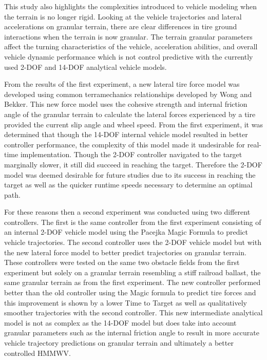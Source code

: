 \documentclass[12pt,onecolumn]{report}
\begin{document}
This study also highlights the complexities introduced to vehicle modeling when the terrain is no longer rigid. Looking at the vehicle trajectories and lateral accelerations on granular terrain, there are clear differences in tire ground interactions when the terrain is now granular. The terrain granular parameters affect the turning characteristics of the vehicle, acceleration abilities, and overall vehicle dynamic performance which is not control predictive with the currently used 2-DOF and 14-DOF analytical vehicle models. 

From the results of the first experiment, a new lateral tire force model was developed using common terramechanics relationships developed by Wong and Bekker. This new force model uses the cohesive strength and internal friction angle of the granular terrain to calculate the lateral forces experienced by a tire provided the current slip angle and wheel speed. From the first experiment, it was determined that though the 14-DOF internal vehicle model resulted in better controller performance, the complexity of this model made it undesirable for real-time implementation. Though the 2-DOF controller navigated to the target marginally slower, it still did succeed in reaching the target. Therefore the 2-DOF model was deemed desirable for future studies due to its success in reaching the target as well as the quicker runtime speeds necessary to determine an optimal path. 

For these reasons then a second experiment was conducted using two different controllers. The first is the same controller from the first experiment consisting of an internal 2-DOF vehicle model using the Pacejka Magic Formula to predict vehicle trajectories. The second controller uses the 2-DOF vehicle model but with the new lateral force model to better predict trajectories on granular terrain. These controllers were tested on the same two obstacle fields from the first experiment but solely on a granular terrain resembling a stiff railroad ballast, the same granular terrain as from the first experiment. The new controller performed better than the old controller using the Magic formula to predict tire forces and this improvement is shown by a lower Time to Target as well as qualitatively smoother trajectories with the second controller. This new intermediate analytical model is not as complex as the 14-DOF model but does take into account granular parameters such as the internal friction angle to result in more accurate vehicle trajectory predictions on granular terrain and ultimately a better controlled HMMWV. 
\end{document}
